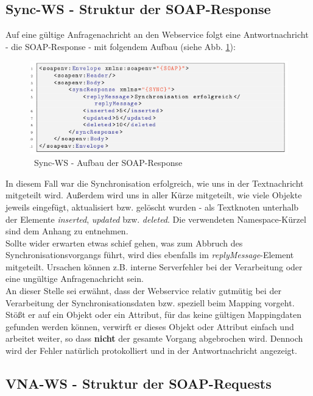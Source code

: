 \documentclass[a4paper,10pt]{book}
\begin{document}
\subsection{Sync-WS - Struktur der SOAP-Response}
Auf eine gültige Anfragenachricht an den Webservice folgt eine Antwortnachricht - die SOAP-Response - mit
folgendem Aufbau (siehe Abb. \ref{Sync-WS - Aufbau der SOAP-Response}):
\newline
\begin{figure}[htb!]
  \centering
  \includegraphics[scale=.7]{Screenshot/SyncAPI_SOAP_Z1-11_soapenv.png}
  \caption{\label{Sync-WS - Aufbau der SOAP-Response} \ Sync-WS - Aufbau der SOAP-Response}
\end{figure}
\newline
In diesem Fall war die Synchronisation erfolgreich, wie uns in der Textnachricht mitgeteilt wird. Außerdem wird
uns in aller Kürze mitgeteilt, wie viele Objekte jeweils eingefügt, aktualisiert bzw. gelöscht wurden - als Textknoten
unterhalb der Elemente \textit{inserted}, \textit{updated} bzw. \textit{deleted}. Die verwendeten
Namespace-Kürzel sind dem Anhang zu entnehmen.
\newline\\
Sollte wider erwarten etwas schief gehen, was zum Abbruch des Synchronisationsvorgangs führt, wird dies ebenfalls
im \textit{replyMessage}-Element mitgeteilt. Ursachen können z.B. interne Serverfehler bei der Verarbeitung oder
eine ungültige Anfragenachricht sein.
\newline\\
An dieser Stelle sei erwähnt, dass der Webservice relativ gutmütig bei der Verarbeitung der Synchronisationsdaten bzw.
speziell beim Mapping vorgeht. Stößt er auf ein Objekt oder ein Attribut, für das keine gültigen Mappingdaten gefunden
werden können, verwirft er dieses Objekt oder Attribut einfach und arbeitet weiter, so dass \textbf{nicht} der gesamte
Vorgang abgebrochen wird. Dennoch wird der Fehler natürlich protokolliert und in der Antwortnachricht angezeigt.

\subsection{VNA-WS - Struktur der SOAP-Requests}
\end{document}
